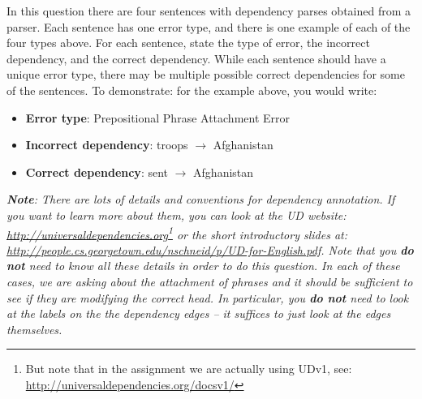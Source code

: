 \begin{parts}
\begin{itemize}
\end{itemize}
In this question there are four sentences with dependency parses obtained from a parser. Each sentence has one error type, and there is one example of each of the four types above. 
For each sentence, state the type of error, the incorrect dependency, and the correct dependency. While each sentence should have a unique error type, there may be multiple possible correct dependencies for some of the sentences.
To demonstrate: for the example above, you would write: 
\begin{itemize}
    \item \textbf{Error type}: Prepositional Phrase Attachment Error 
    \item \textbf{Incorrect dependency}: troops $\rightarrow$ Afghanistan 
    \item \textbf{Correct dependency}: sent $\rightarrow$ Afghanistan
\end{itemize}

\textit{
\textbf{Note}: 
There are lots of details and conventions for dependency annotation. 
If you want to learn more about them, you can look at the UD website: \url{http://universaldependencies.org}\footnote{But note that in the assignment we are actually using UDv1, see: \url{http://universaldependencies.org/docsv1/}} or the short introductory slides at: \url{http://people.cs.georgetown.edu/nschneid/p/UD-for-English.pdf}. 
Note that you \textbf{do not} need to know all these details in order to do this question. In each of these cases, we are asking about the attachment of phrases and it should be sufficient to see if they are modifying the correct head.
In particular, you \textbf{do not} need to look at the labels on the the dependency edges -- it suffices to just look at the edges themselves.  
}




\newpage
\end{parts}
